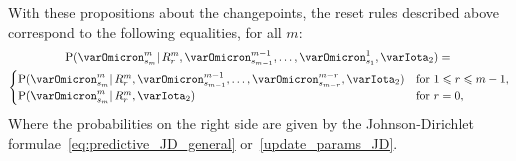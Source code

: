 \documentclass[\ifafour a4paper,12pt,\else a5paper,10pt,\fi%
onecolumn,oneside,article,%
british%
]{memoir}
\theoremstyle{remark}
\theoremstyle{innote}
\renewcommand{\le}{\leqslant}%
\newcommand*{\p}{\mathrm{P}}%
\renewcommand*{\|}{\mathpunct{|}}
\newcommand*{\yI}{\varIota}
\newcommand*{\yMc}{\yI_2}
\begin{document}
With these propositions about the changepoints, the reset rules described
above correspond to the following equalities, for all $m$:
\begin{multline}
  \label{eq:irrelevant_data_conditional_R}
  \p(\varOmicron^{m}_{s_{m}} \|
  R^{m}_{r},  \varOmicron^{m-1}_{s_{m-1}}, \dotsc, \varOmicron^{1}_{s_{1}}, \yMc)
  ={}\\
  \begin{cases}
  \p(\varOmicron^{m}_{s_{m}} \|
    R^{m}_{r},  \varOmicron^{m-1}_{s_{m-1}}, \dotsc, \varOmicron^{m-r}_{s_{m-r}}, \yMc)
    &\text{for $1\le r\le m-1$},
      \\
  \p(\varOmicron^{m}_{s_{m}} \|
    R^{m}_{r}, \yMc)
    &\text{for $r=0$},
  \end{cases}
\end{multline}
Where the probabilities on the right side are given by the
Johnson-Dirichlet formulae~\eqref{eq:predictive_JD_general}
or~\eqref{update_params_JD}.
\end{document}
